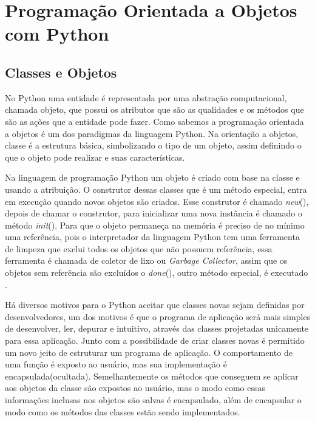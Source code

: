 

\chapter{ Programação Orientada a Objetos com Python}



    \section{Classes e Objetos}
	 No Python uma entidade é representada por uma abstração computacional, chamada objeto, que possui os atributos que são as qualidades e os métodos que são as ações que a entidade pode fazer. Como sabemos a programação orientada a objetos é um dos paradigmas da linguagem Python. Na orientação a objetos, classe é a estrutura básica, simbolizando o tipo de um objeto, assim definindo o que o objeto pode realizar e suas características.
	 
	 Na linguagem de programação Python um objeto é criado com base na classe e usando a atribuição. O construtor dessas classes que é um método especial, entra em execução quando novos objetos são criados. Esse construtor é chamado \textunderscore \textit{new}\textunderscore(), depois de chamar o construtor, para inicializar uma nova instância é chamado o método \textunderscore \textit{init}\textunderscore(). Para que o objeto permaneça na memória é preciso de no mínimo uma referência, pois o interpretador da linguagem Python tem uma ferramenta de limpeza que exclui todos os objetos que não possuem referência, essa ferramenta é chamada de coletor de lixo ou \textit{Garbage Collector}, assim que os objetos sem referência são excluídos o \textunderscore \textit{done}\textunderscore(), outro método especial, é executado \cite{Borges2014}.
	 
	Há diversos motivos para o Python aceitar que classes novas sejam definidas por desenvolvedores, um dos motivos é que o programa de aplicação será mais simples de desenvolver, ler, depurar e intuitivo, através das classes projetadas unicamente para essa aplicação. Junto com a possibilidade de criar classes novas é permitido um novo jeito de estruturar um programa de aplicação. O comportamento de uma função é exposto ao usuário, mas sua implementação é encapsulada(ocultada). Semelhantemente os métodos que conseguem se aplicar aos objetos da classe são expostos ao usuário, mas o modo como essas informações inclusas nos objetos são salvas é encapsulado, além de encapsular o modo como os métodos das classes estão sendo implementados.
	 
